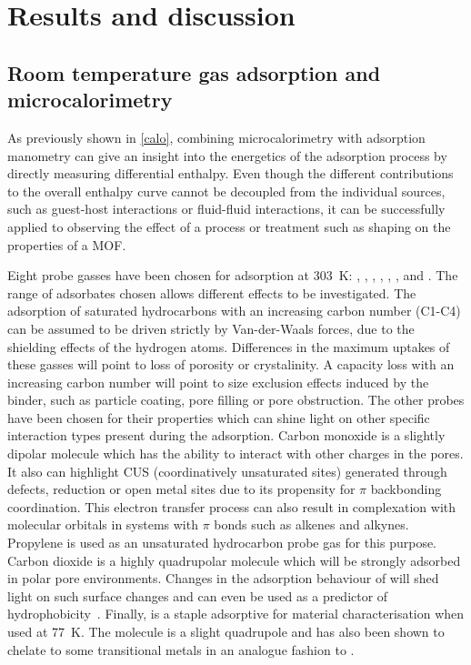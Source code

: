 
\section{Results and discussion}




\subsection{Room temperature gas adsorption and microcalorimetry}

As previously shown in \autoref{calo},
combining microcalorimetry with adsorption manometry
can give an insight into the energetics of the
adsorption process by directly measuring differential enthalpy.
Even though the different contributions to the overall enthalpy curve
cannot be decoupled from the individual sources, such as guest-host
interactions or fluid-fluid interactions, it can be successfully
applied to observing the effect of a process or treatment such as shaping
on the properties of a \gls{MOF}.

Eight probe gasses have been chosen for adsorption at \SI{303}{\kelvin}:
, , , , , ,
 and .
The range of adsorbates chosen allows different effects to be investigated.
The adsorption of saturated hydrocarbons with an increasing
carbon number (C1-C4) can be
assumed to be driven strictly by Van-der-Waals forces,
due to the shielding effects of the hydrogen atoms.
Differences in the maximum uptakes of these gasses will point to
loss of porosity or crystalinity. A capacity loss with
an increasing carbon number will point to size exclusion effects
induced by the binder, such as particle coating, pore filling or
pore obstruction.
The other probes have been chosen for their properties which can
shine light on other specific interaction types
present during the adsorption.
Carbon monoxide is a slightly dipolar molecule which has the
ability to interact with other charges in the pores.
It also can highlight CUS (coordinatively unsaturated sites)
generated through defects, reduction or open metal sites due to its
propensity for \( \pi \) backbonding coordination.
This electron transfer process can also result in complexation with
molecular orbitals in systems with \( \pi \) bonds such as alkenes 
and alkynes.
Propylene is used as an unsaturated hydrocarbon probe gas for this purpose.
Carbon dioxide is a highly quadrupolar molecule which will be
strongly adsorbed in polar pore environments. Changes in the adsorption
behaviour of  will shed light on such surface changes and
can even be used as a predictor
of hydrophobicity~\cite{chanutScreeningEffectWater2017}.
Finally,  is a staple adsorptive for material characterisation
when used at \SI{77}{\kelvin}. The molecule is a slight quadrupole
and has also been shown to chelate to some transitional metals in
an analogue fashion to .

